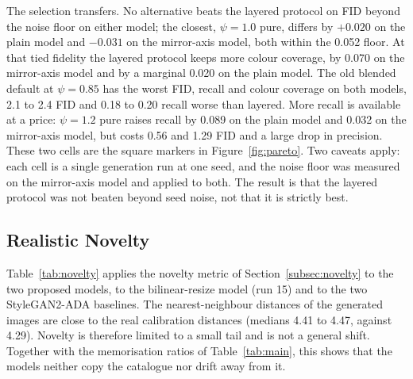 \documentclass[electronics,article,submit,pdftex,moreauthors]{Definitions/mdpi}
\begin{document}
The selection transfers. No alternative beats the layered protocol on FID
beyond the noise floor on either model; the closest, $\psi = 1.0$ pure,
differs by $+0.020$ on the plain model and $-0.031$ on the mirror-axis model,
both within the 0.052 floor. At that tied fidelity the layered protocol keeps
more colour coverage, by 0.070 on the mirror-axis model and by a marginal
0.020 on the plain model. The old blended default at $\psi = 0.85$ has the
worst FID, recall and colour coverage on both models, 2.1 to 2.4 FID and 0.18
to 0.20 recall worse than layered. More recall is available at a price:
$\psi = 1.2$ pure raises recall by 0.089 on the plain model and 0.032 on the
mirror-axis model, but costs 0.56 and 1.29 FID and a large drop in precision.
These two cells are the square markers in Figure~\ref{fig:pareto}. Two
caveats apply: each cell is a single generation run at one seed, and the
noise floor was measured on the mirror-axis model and applied to both. The
result is that the layered protocol was not beaten beyond seed noise, not
that it is strictly best.

\subsection{Realistic Novelty}
\label{subsec:novelty_results}

Table~\ref{tab:novelty} applies the novelty metric of
Section~\ref{subsec:novelty} to the two proposed models, to the
bilinear-resize model (run 15) and to the two StyleGAN2-ADA baselines. The
nearest-neighbour distances of the generated images are close to the real
calibration distances (medians 4.41 to 4.47, against 4.29). Novelty is
therefore limited to a small tail and is not a general shift. Together with
the memorisation ratios of Table~\ref{tab:main}, this shows that the models
neither copy the catalogue nor drift away from it.
\end{document}
